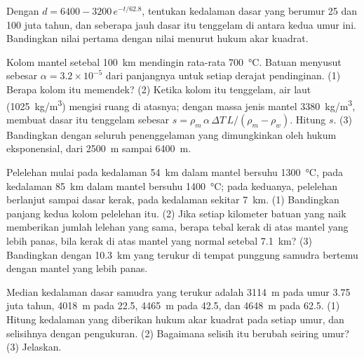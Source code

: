 \begin{exercise}[$\star\star$]\label{exo:g11:ocean-ridges:11}
Dengan $d = 6400 - 3200\,e^{-t/62.8}$, tentukan kedalaman dasar yang berumur 25
dan 100 juta tahun, dan seberapa jauh dasar itu tenggelam di antara kedua umur
ini. Bandingkan nilai pertama dengan nilai menurut hukum akar kuadrat.
\end{exercise}

\begin{exercise}[$\star\star\star$]\label{exo:g11:ocean-ridges:12}
Kolom mantel setebal \qty{100}{km} mendingin rata-rata \qty{700}{\celsius}.
Batuan menyusut sebesar $\alpha = 3.2 \times 10^{-5}$ dari panjangnya untuk
setiap derajat pendinginan. (1) Berapa kolom itu memendek? (2) Ketika kolom itu
tenggelam, air laut (\qty{1025}{kg/m^3}) mengisi ruang di atasnya; dengan massa
jenis mantel \qty{3380}{kg/m^3},  membuat dasar itu tenggelam sebesar
$s = \rho_m\,\alpha\,\Delta T\,L/(\rho_m - \rho_w)$. Hitung $s$. (3) Bandingkan
dengan seluruh penenggelaman yang dimungkinkan oleh hukum eksponensial, dari
\qty{2500}{m} sampai \qty{6400}{m}.
\end{exercise}

\begin{exercise}[$\star\star\star$]\label{exo:g11:ocean-ridges:13}
Pelelehan mulai pada kedalaman \qty{54}{km} dalam mantel bersuhu
\qty{1300}{\celsius}, pada kedalaman \qty{85}{km} dalam mantel bersuhu
\qty{1400}{\celsius}; pada keduanya, pelelehan berlanjut sampai dasar kerak,
pada kedalaman sekitar \qty{7}{km}. (1) Bandingkan panjang kedua kolom pelelehan
itu. (2) Jika setiap kilometer batuan yang naik memberikan jumlah lelehan yang
sama, berapa tebal kerak di atas mantel yang lebih panas, bila kerak di atas
mantel yang normal setebal \qty{7.1}{km}? (3) Bandingkan dengan \qty{10.3}{km}
yang terukur di tempat punggung samudra bertemu dengan mantel yang lebih panas.
\end{exercise}

\begin{exercise}[$\star\star\star$]\label{exo:g11:ocean-ridges:14}
Median kedalaman dasar samudra yang terukur adalah \qty{3114}{m} pada umur
\num{3.75} juta tahun, \qty{4018}{m} pada \num{22.5}, \qty{4465}{m} pada
\num{42.5}, dan \qty{4648}{m} pada \num{62.5}. (1) Hitung kedalaman yang
diberikan hukum akar kuadrat pada setiap umur, dan selisihnya dengan pengukuran.
(2) Bagaimana selisih itu berubah seiring umur? (3) Jelaskan.
\end{exercise}

